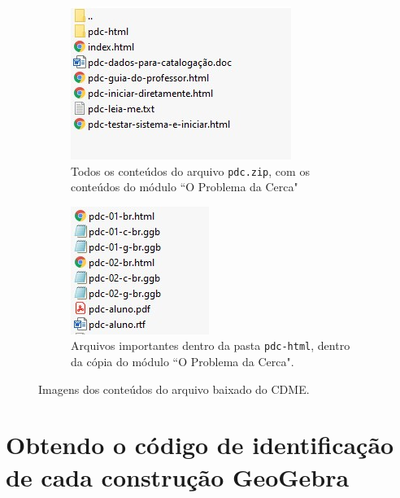 \begin{figure}[hbt]
    \begin{subfigure}{0.5\textwidth}
    \centering
    \includegraphics[width=.8\textwidth]{media/tec-pdc-zip.jpg}
    \caption{Todos os conteúdos do arquivo \texttt{pdc.zip}, com os conteúdos do módulo ``O Problema da Cerca"}
    \label{fig:pdc-zip}
    \end{subfigure}
    \hfill
    \begin{subfigure}{0.4\textwidth}
    \centering
    \includegraphics[width=.7\textwidth]{media/tec-pdc-html-alguns.jpg}
    \caption{Arquivos importantes dentro da pasta \texttt{pdc-html}, dentro da cópia do módulo ``O Problema da Cerca".}
    \label{fig:pdc-html}
    \end{subfigure}
    \caption{Imagens dos conteúdos do arquivo baixado do CDME.}
\end{figure}

\section{Obtendo o código de identificação de cada construção GeoGebra}

